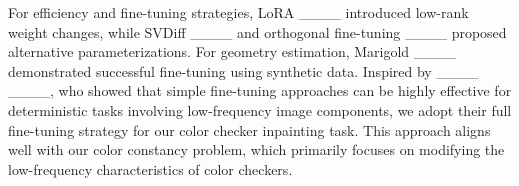 % 
For efficiency and fine-tuning strategies, LoRA ____ introduced low-rank weight changes, while SVDiff ____ and orthogonal fine-tuning ____ proposed alternative parameterizations. For geometry estimation, Marigold ____ demonstrated successful fine-tuning using synthetic data. Inspired by ____ ____, who showed that simple fine-tuning approaches can be highly effective for deterministic tasks involving low-frequency image components, we adopt their full fine-tuning strategy for our color checker inpainting task. This approach aligns well with our color constancy problem, which primarily focuses on modifying the low-frequency characteristics of color checkers.

